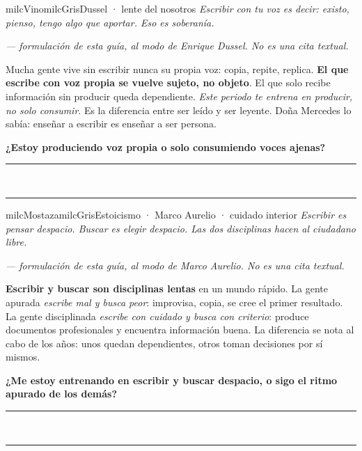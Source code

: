 \documentclass[11pt,letterpaper]{article}
\newcommand{\linead}[1]{\noindent\color{milcLinea}\rule{#1}{0.5pt}\color{milcNegro}}
\begin{document}
\begin{softbox}{milcVino}{milcGris}{Dussel · lente del nosotros}
\textit{Escribir con tu voz es decir: existo, pienso, tengo algo que aportar. Eso es soberanía.}

{\footnotesize\itshape\color{milcNegro!70}--- formulación de esta guía, al modo de Enrique Dussel. No es una cita textual.}

Mucha gente vive sin escribir nunca su propia voz: copia, repite, replica. \textbf{El que escribe con voz propia se vuelve sujeto, no objeto}. El que solo recibe información sin producir queda dependiente. \emph{Este periodo te entrena en producir, no solo consumir}. Es la diferencia entre ser leído y ser leyente. Doña Mercedes lo sabía: enseñar a escribir es enseñar a ser persona.

\textbf{¿Estoy produciendo voz propia o solo consumiendo voces ajenas?}
\end{softbox}
\linead{\linewidth}\\[1mm]
\linead{\linewidth}

\begin{softbox}{milcMostaza}{milcGris}{Estoicismo · Marco Aurelio · cuidado interior}
\textit{Escribir es pensar despacio. Buscar es elegir despacio. Las dos disciplinas hacen al ciudadano libre.}

{\footnotesize\itshape\color{milcNegro!70}--- formulación de esta guía, al modo de Marco Aurelio. No es una cita textual.}

\textbf{Escribir y buscar son disciplinas lentas} en un mundo rápido. La gente apurada \emph{escribe mal y busca peor}: improvisa, copia, se cree el primer resultado. La gente disciplinada \emph{escribe con cuidado y busca con criterio}: produce documentos profesionales y encuentra información buena. La diferencia se nota al cabo de los años: unos quedan dependientes, otros toman decisiones por sí mismos.

\textbf{¿Me estoy entrenando en escribir y buscar despacio, o sigo el ritmo apurado de los demás?}
\end{softbox}
\linead{\linewidth}\\[1mm]
\linead{\linewidth}
\end{document}
